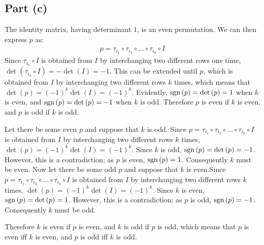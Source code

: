 \documentclass{article}
\begin{document}
\subsection*{Part (c)}
The identity matrix, having determinant $1$, is an even permutation.  We can then express $p$ as:
\begin{equation}
    \begin{split}
        p = \tau_{i_1} \circ \tau_{i_2} \circ \ldots \circ \tau_{i_k} \circ I
    \end{split}
\end{equation}
Since $\tau_{i_k} \circ I$ is obtained from $I$ by interchanging two different rows one time, $\det\left(\tau_{i_k} \circ I\right) = -\det\left(I\right) = -1$. This can be extended until $p$, which is obtained from $I$ by interchanging two different rows $k$ times, which means that $\det\left(p\right) = \left(-1\right)^k\det\left(I\right) = \left(-1\right)^k$. Evidently, $\operatorname{sgn}\left(p\right) = \det\left(p\right) = 1$ when $k$ is even, and $\operatorname{sgn}\left(p\right) = \det\left(p\right) = -1$ when $k$ is odd. Therefore $p$ is even if $k$ is even, and $p$ is odd if $k$ is odd.

Let there be some even $p$ and suppose that $k$ is odd. Since $p = \tau_{i_1} \circ \tau_{i_2} \circ \ldots \circ \tau_{i_k} \circ I$ is obtained from $I$ by interchanging two different rows $k$ times, $\det\left(p\right) = \left(-1\right)^k\det\left(I\right) = \left(-1\right)^k$.  Since $k$ is odd, $\operatorname{sgn}\left(p\right) = \det\left(p\right) = -1$. However, this is a contradiction; as $p$ is even, $\operatorname{sgn}\left(p\right) = 1$. Consequently $k$ must be even. Now let there be some odd $p$ and suppose that $k$ is even.Since $p = \tau_{i_1} \circ \tau_{i_2} \circ \ldots \circ \tau_{i_k} \circ I$ is obtained from $I$ by interchanging two different rows $k$ times, $\det\left(p\right) = \left(-1\right)^k\det\left(I\right) = \left(-1\right)^k$. Since $k$ is even, $\operatorname{sgn}\left(p\right) = \det\left(p\right) = 1$. However, this is a contradiction; as $p$ is odd, $\operatorname{sgn}\left(p\right) = -1$. Consequently $k$ must be odd.

Therefore $k$ is even if $p$ is even, and $k$ is odd if $p$ is odd, which means that $p$ is even iff $k$ is even, and $p$ is odd iff $k$ is odd.
\end{document}
